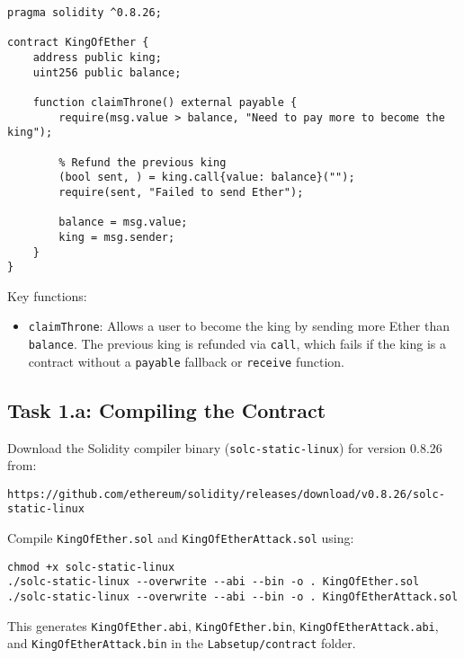 \begin{lstlisting}[language=Solidity, caption = The vulnerable contract (\texttt{KingOfEther.sol})]
% SPDX-License-Identifier: MIT
pragma solidity ^0.8.26;

contract KingOfEther {
    address public king;
    uint256 public balance;

    function claimThrone() external payable {
        require(msg.value > balance, "Need to pay more to become the king");
        
        % Refund the previous king
        (bool sent, ) = king.call{value: balance}("");
        require(sent, "Failed to send Ether");
        
        balance = msg.value;
        king = msg.sender;
    }
}
\end{lstlisting}

Key functions:
\begin{itemize}
    \item \texttt{claimThrone}: Allows a user to become the king by sending more Ether than \texttt{balance}. The previous king is refunded via \texttt{call}, which fails if the king is a contract without a \texttt{payable} fallback or \texttt{receive} function.
\end{itemize}

\subsection{Task 1.a: Compiling the Contract}

Download the Solidity compiler binary (\texttt{solc-static-linux}) for version 0.8.26 from:

\begin{lstlisting}
https://github.com/ethereum/solidity/releases/download/v0.8.26/solc-static-linux
\end{lstlisting}

Compile \texttt{KingOfEther.sol} and \texttt{KingOfEtherAttack.sol} using:

\begin{lstlisting}
chmod +x solc-static-linux
./solc-static-linux --overwrite --abi --bin -o . KingOfEther.sol
./solc-static-linux --overwrite --abi --bin -o . KingOfEtherAttack.sol
\end{lstlisting}

This generates \texttt{KingOfEther.abi}, \texttt{KingOfEther.bin}, \texttt{KingOfEtherAttack.abi}, and \texttt{KingOfEtherAttack.bin} in the \texttt{Labsetup/contract} folder.

